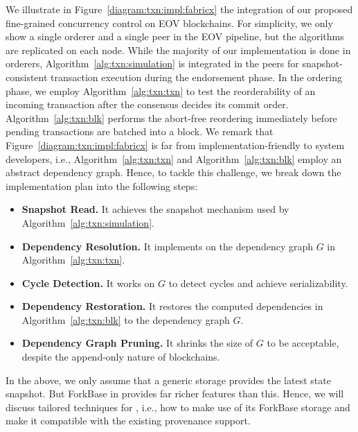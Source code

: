 We illustrate in Figure~\ref{diagram:txn:impl:fabricx} the integration of our proposed fine-grained concurrency control on EOV blockchains. 
%
For simplicity, we only show a single orderer and a single peer in the EOV pipeline, but the algorithms are replicated on each node. 
%
While the majority of our implementation is done in orderers, Algorithm~\ref{alg:txn:simulation} is integrated in the peers for snapshot-consistent transaction execution during the endorsement phase.
%
In the ordering phase, we employ Algorithm~\ref{alg:txn:txn} to test the reorderability of an incoming transaction after the consensus decides its commit order.
%
Algorithm~\ref{alg:txn:blk} performs the abort-free reordering immediately before pending transactions are batched into a block. 
%
We remark that Figure~\ref{diagram:txn:impl:fabricx} is far from implementation-friendly to system developers, i.e.,  Algorithm~\ref{alg:txn:txn} and Algorithm~\ref{alg:txn:blk} employ an abstract dependency graph.
%
Hence, to tackle this challenge, we break down the implementation plan into the following steps: 
\begin{itemize}
  \item \textbf{Snapshot Read.} It achieves the snapshot mechanism used by Algorithm~\ref{alg:txn:simulation}.
  \item \textbf{Dependency Resolution.} It implements on the dependency graph $G$ in Algorithm~\ref{alg:txn:txn}.
  \item \textbf{Cycle Detection.} It works on $G$ to detect cycles and achieve serializability.
  \item \textbf{Dependency Restoration.} It restores the computed  dependencies in Algorithm~\ref{alg:txn:blk} to the dependency graph $G$.
  \item \textbf{Dependency Graph Pruning.} It shrinks the size of $G$ to be acceptable, despite the append-only nature of blockchains. 
\end{itemize}
In the above, we only assume that a generic storage provides the latest state snapshot. 
But ForkBase in {\fs} provides far richer features than this.
Hence, we will discuss tailored techniques for {\fs} , i.e., how to make use of its ForkBase storage and make it compatible with the existing provenance support. 


